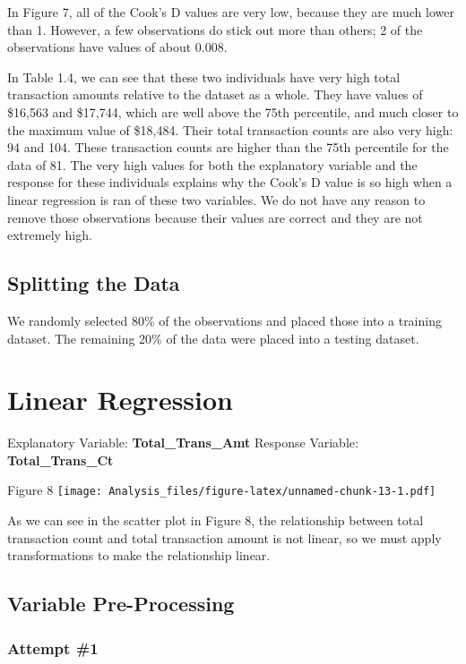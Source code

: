 \documentclass[
]{article}
\begin{document}
In Figure 7, all of the Cook's D values are very low, because they are
much lower than 1. However, a few observations do stick out more than
others; 2 of the observations have values of about 0.008.

In Table 1.4, we can see that these two individuals have very high total
transaction amounts relative to the dataset as a whole. They have values
of \$16,563 and \$17,744, which are well above the 75th percentile, and
much closer to the maximum value of \$18,484. Their total transaction
counts are also very high: 94 and 104. These transaction counts are
higher than the 75th percentile for the data of 81. The very high values
for both the explanatory variable and the response for these individuals
explains why the Cook's D value is so high when a linear regression is
ran of these two variables. We do not have any reason to remove those
observations because their values are correct and they are not extremely
high.

\hypertarget{splitting-the-data}{%
\subsection{Splitting the Data}\label{splitting-the-data}}

We randomly selected 80\% of the observations and placed those into a
training dataset. The remaining 20\% of the data were placed into a
testing dataset.

\hypertarget{linear-regression}{%
\section{Linear Regression}\label{linear-regression}}

Explanatory Variable: \textbf{Total\_Trans\_Amt} Response Variable:
\textbf{Total\_Trans\_Ct}

Figure 8
\texttt{[image: Analysis\_files/figure-latex/unnamed-chunk-13-1.pdf]}

As we can see in the scatter plot in Figure 8, the relationship between
total transaction count and total transaction amount is not linear, so
we must apply transformations to make the relationship linear.

\hypertarget{variable-pre-processing}{%
\subsection{Variable Pre-Processing}\label{variable-pre-processing}}

\hypertarget{attempt-1}{%
\subsubsection{Attempt \#1}\label{attempt-1}}
\end{document}
